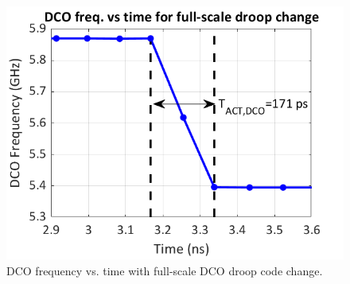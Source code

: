 \documentclass[twoside,9pt,journal,letterpage]{IEEEtran}
\begin{document}
%
%
%

\vspace{-10pt}
\begin{figure}[!htb]
	\centering
	\includegraphics[width=0.7\columnwidth]{fig_dco_response.png}
	\caption{DCO frequency vs. time with full-scale DCO droop code change.}
	\label{fig:dco_response}
\end{figure}
\FloatBarrier
\end{document}
